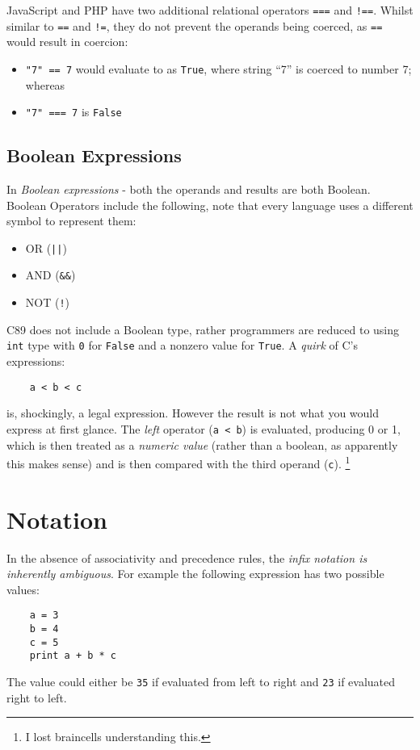 JavaScript and PHP have two additional relational operators \verb|===| and \verb|!==|. Whilst similar to \verb|==| and \verb|!=|, they do not prevent the operands being coerced, as \verb|==| would result in coercion:
\begin{itemize}
    \item \verb|"7" == 7| would evaluate to as \verb|True|, where string ``7'' is coerced to number 7; whereas
    \item \verb|"7" === 7| is \verb|False|
\end{itemize}

\subsection{Boolean Expressions}
In \textit{Boolean expressions} - both the operands and results are both Boolean. Boolean Operators include the following, note that every language uses a different symbol to represent them:
\begin{itemize}
    \item OR (\verb+||+)
    \item AND (\verb|&&|)
    \item NOT (\verb|!|)
\end{itemize}
C89 does not include a Boolean type, rather programmers are reduced to using \verb|int| type with \verb|0| for \verb|False| and a nonzero value for \verb|True|. A \textit{quirk} of C's expressions:
\begin{verbatim}
    a < b < c
\end{verbatim}
is, shockingly, a legal expression. However the result is not what you would express at first glance. The \textit{left} operator (\verb|a < b|) is evaluated, producing 0 or 1, which is then treated as a \textit{numeric value} (rather than a boolean, as apparently this makes sense) and is then compared with the third operand (\verb|c|). \footnote{I lost braincells understanding this.}


\section{Notation}
In the absence of associativity and precedence rules, the \textit{infix notation is inherently ambiguous}. For example the following expression has two possible values:
\begin{verbatim}
    a = 3
    b = 4
    c = 5
    print a + b * c
\end{verbatim}
The value could either be \verb|35| if evaluated from left to right and \verb|23| if evaluated right to left.\\

